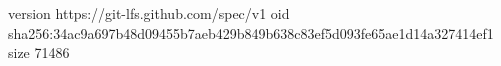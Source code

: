 version https://git-lfs.github.com/spec/v1
oid sha256:34ac9a697b48d09455b7aeb429b849b638c83ef5d093fe65ae1d14a327414ef1
size 71486
